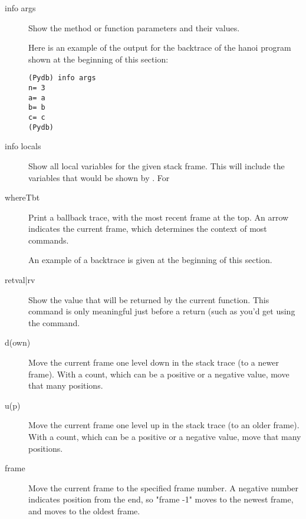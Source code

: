 \begin{description}

\item[info args]\label{command:info-args}

Show the method or function parameters and their values. 

Here is an example of the output for the backtrace of the hanoi
program shown at the beginning of this section:

\begin{verbatim}
(Pydb) info args
n= 3
a= a
b= b
c= c
(Pydb) 
\end{verbatim}

\item[info locals]\label{command:info-locals}

Show all local variables for the given stack frame. This will include
the variables that would be shown by . For 

\item[where\code{\Large{|}}T\code{\Large{|}}bt]

Print a ballback trace, with the most recent frame at the top.  An
arrow indicates the current frame, which determines the context of
most commands.

An example of a backtrace is given at the beginning of this section.

\item[retval{\Large{|}}rv]

Show the value that will be returned by the current function. This
command is only meaningful just before a return (such as you'd get
using the  command.

\item[d(own) ]

Move the current frame one level down in the stack trace
(to a newer frame). With a count, which can be a positive
or a negative value, move that many positions.

\item[u(p) ]

Move the current frame one level up in the stack trace (to an older
frame). With a count, which can be a positive or a negative value,
move that many positions.

\item[frame ]
Move the current frame to the specified frame number. A negative
number indicates position from the end, so "frame -1" moves to 
the newest frame, and  moves to the oldest frame.

\end{description}


